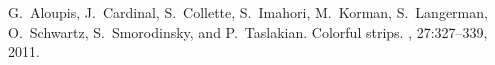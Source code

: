 G.~Aloupis, J.~Cardinal, S.~Collette, S.~Imahori, M.~Korman, S.~Langerman,
  O.~Schwartz, S.~Smorodinsky, and P.~Taslakian.
\newblock Colorful strips.
, 27:327--339, 2011.
